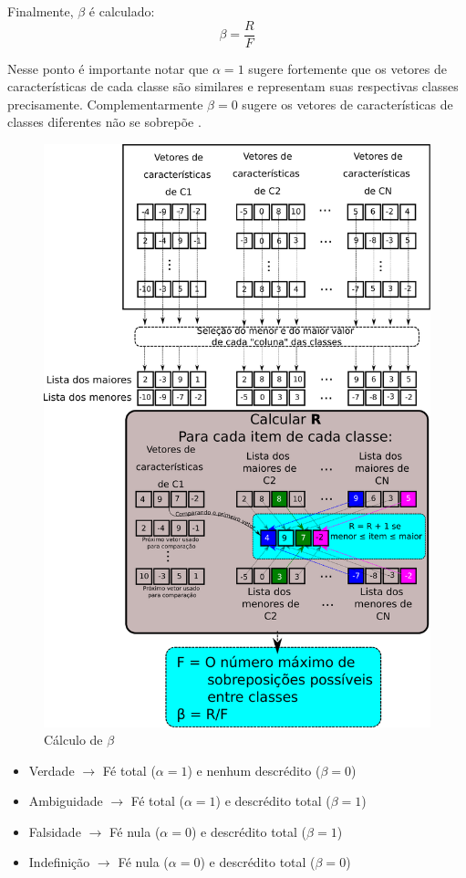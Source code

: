 \documentclass[a4paper,12pt,openright,oneside]{book}
\newenvironment{myenv}[1]
  {\begin{spacing}{#1}}
  {\end{spacing}}
\begin{document}
\begin{myenv}{1.5}
						\par Finalmente, $\beta$ é calculado:
						\begin{equation}
							\beta=\dfrac{R}{F}
						\end{equation}
					
						\par Nesse ponto é importante notar que $\alpha=1$ sugere fortemente que os vetores de características de cada classe são similares e representam suas respectivas classes precisamente. Complementarmente $\beta=0$ sugere os vetores de características de classes diferentes não se sobrepõe \cite{8588433}.
						
						\begin{figure}[h]
							\centering
							\includegraphics[width=0.55\linewidth]{images/betaCalculation.pdf}
							\caption{Cálculo de $\beta$}
							\label{fig:betacalculation}
						\end{figure}
						
						\begin{itemize}
							\item Verdade $\rightarrow$ Fé total ($\alpha = 1$) e nenhum descrédito ($\beta = 0$)
							\item Ambiguidade $\rightarrow$ Fé total ($\alpha = 1$) e descrédito total ($\beta = 1$)
							\item Falsidade $\rightarrow$ Fé nula ($\alpha = 0$) e descrédito total ($\beta = 1$)
							\item Indefinição $\rightarrow$ Fé nula ($\alpha = 0$) e descrédito total ($\beta = 0$)
						\end{itemize}
						

\end{myenv}
\end{document}
